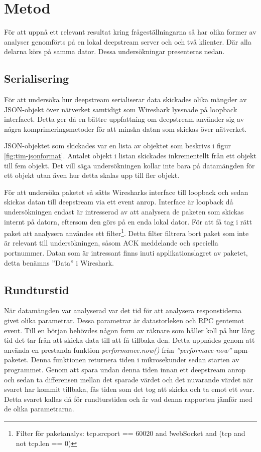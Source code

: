 \section{Metod}
\label{sec:tim-method}
För att uppnå ett relevant resultat kring frågeställningarna så har olika former av analyser genomförts på en lokal deepstream server och och två klienter. Där alla delarna körs på samma dator. Dessa undersökningar presenteras nedan.

\subsection{Serialisering}
\label{subsec:tim-method-serializing}
För att undersöka hur deepstream serialiserar data skickades olika mängder av JSON-objekt över nätverket samtidigt som Wireshark lyssnade på loopback interfacet. Detta ger då en bättre uppfattning om deepstream använder sig av några komprimeringsmetoder för att minska datan som skickas över nätverket.

JSON-objektet som skickades var en lista av objektet som beskrivs i figur \ref{fig:tim-jsonformat}. Antalet objekt i listan skickades inkrementellt från ett objekt till fem objekt. Det vill säga undersökningen kollar inte bara på datamängden för ett objekt utan även hur detta skalas upp till fler objekt. 

För att undersöka paketet så sätts Wiresharks interface till loopback och sedan skickas datan till deepstream via ett event anrop. Interface är loopback då undersökningen endast är intresserad av att analysera de paketen som skickas internt på datorn, eftersom den görs på en enda lokal dator. För att få tag i rätt paket att analysera användes ett filter\footnote{Filter för paketanalys: tcp.srcport == 60020 and !webSocket and (tcp and not tcp.len == 0)}. Detta filter filtrera bort paket som inte är relevant till undersökningen, såsom ACK meddelande och speciella portnummer. Datan som är intressant finns inuti applikationslagret av paketet, detta benämns ''Data'' i Wireshark.

\subsection{Rundturstid}
\label{subsec:tim-method-response}
När datamängden var analyserad var det tid för att analysera responstiderna givet olika parametrar. Dessa parametrar är datastorleken och RPC gentemot event. Till en början behövdes någon form av räknare som håller koll på hur lång tid det tar från att skicka data till att få tillbaka den. Detta uppnådes genom att använda en prestanda funktion \textit{performance.now()} från \textit{''performace-now''}\cite{performance-now} npm-paketet. Denna funktionen returnera tiden i mikrosekunder sedan starten av programmet. Genom att spara undan denna tiden innan ett deepstream anrop och sedan ta differensen mellan det sparade värdet och det nuvarande värdet när svaret har kommit tillbaka, fås tiden som det tog att skicka och ta emot ett svar. Detta svaret kallas då för rundturstiden och är vad denna rapporten jämför med de olika parametrarna. 

